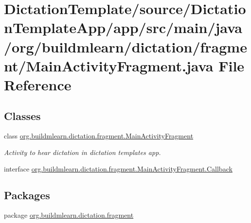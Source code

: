 \hypertarget{DictationTemplate_2source_2DictationTemplateApp_2app_2src_2main_2java_2org_2buildmlearn_2dictati3611c804a9f7d5640dad8f6b7ba116ed}{}\section{Dictation\+Template/source/\+Dictation\+Template\+App/app/src/main/java/org/buildmlearn/dictation/fragment/\+Main\+Activity\+Fragment.java File Reference}
\label{DictationTemplate_2source_2DictationTemplateApp_2app_2src_2main_2java_2org_2buildmlearn_2dictati3611c804a9f7d5640dad8f6b7ba116ed}
\subsection*{Classes}
\begin{DoxyCompactItemize}
\item 
class \hyperlink{classorg_1_1buildmlearn_1_1dictation_1_1fragment_1_1MainActivityFragment}{org.\+buildmlearn.\+dictation.\+fragment.\+Main\+Activity\+Fragment}
\begin{DoxyCompactList}\small\item\em Activity to hear dictation in dictation template\textquotesingle{}s app. \end{DoxyCompactList}\item 
interface \hyperlink{interfaceorg_1_1buildmlearn_1_1dictation_1_1fragment_1_1MainActivityFragment_1_1Callback}{org.\+buildmlearn.\+dictation.\+fragment.\+Main\+Activity\+Fragment.\+Callback}
\end{DoxyCompactItemize}
\subsection*{Packages}
\begin{DoxyCompactItemize}
\item 
package \hyperlink{namespaceorg_1_1buildmlearn_1_1dictation_1_1fragment}{org.\+buildmlearn.\+dictation.\+fragment}
\end{DoxyCompactItemize}
